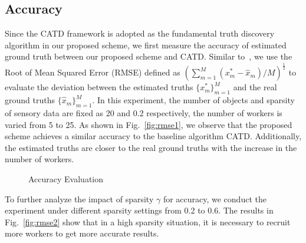 \documentclass[conference]{IEEEtran}
\begin{document}
\subsection{Accuracy}
Since the CATD framework is adopted as the fundamental truth discovery algorithm in our proposed scheme, we first measure the accuracy of estimated ground truth between our proposed scheme and CATD.
Similar to~\cite{zhang_reliable_2019,xue_inpptd_2020}, we use the Root of Mean Squared Error (RMSE) defined as $(\sum_{m=1}^M (x_m^* - \hat{x}_m)/M)^{\frac{1}{2}}$ to evaluate the deviation between the estimated truths $\{x_m^*\}_{m=1}^M$ and the real ground truths $\{\hat{x}_m\}_{m=1}^M$.
In this experiment, the number of objects and sparsity of sensory data are fixed as 20 and 0.2 respectively, the number of workers is varied from 5 to 25.
As shown in Fig.~\ref{fig:rmse1}, we observe that the proposed scheme achieves a similar accuracy to the baseline algorithm CATD.
Additionally, the estimated truths are closer to the real ground truths with the increase in the number of workers.
\begin{figure}[htbp]
  \centering 
  \caption{Accuracy Evaluation}
  \label{fig:rmse} 
\end{figure}
To further analyze the impact of sparsity $\gamma$ for accuracy, we conduct the experiment under different sparsity settings from 0.2 to 0.6.
The results in Fig.~\ref{fig:rmse2} show that in a high sparsity situation, it is necessary to recruit more workers to get more accurate results.
\end{document}
